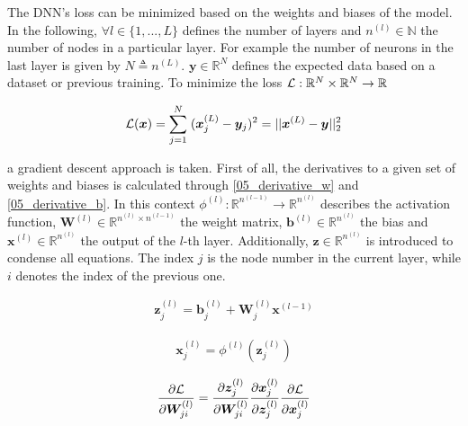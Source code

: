 The DNN's loss can be minimized based on the weights and biases of the model. In the following,
$\forall l \in \{ 1, ..., L \}$ defines the number of layers and $n^{(l)} \in \mathbb{N}$ the number of nodes in a particular layer.
For example the number of neurons in the last layer is given by $N \triangleq n^{(L)}$. $\bm{y} \in \mathbb{R}^N$ defines the expected data based on a dataset or previous training.
To minimize the loss $\mathcal{L} : \mathbb{R}^{N} \times \mathbb{R}^{N} \rightarrow \mathbb{R}$
\endgroup

\begin{equation}
\label{05_loss}
\begin{aligned}
  \mathcal{L}(\bm{x}) = \sum_{j=1}^{N} \; (\bm{x}_j^{(L)} - \bm{y}_j)^2 = \lvert\lvert \bm{x}^{(L)} - \bm{y} \rvert\rvert^2_2
\end{aligned}
\end{equation}


\begingroup
a gradient descent approach is taken.
First of all, the derivatives to a given set of weights and biases is calculated through \ref{05_derivative_w} and \ref{05_derivative_b}.
In this context $\phi^{(l)} : \mathbb{R}^{n^{(l-1)}}\rightarrow \mathbb{R}^{n^{(l)}}$ describes the activation function,
$\bm{W}^{(l)} \in \mathbb{R}^{n^{(l)} \times n^{(l-1)}}$ the weight matrix, $\bm{b}^{(l)} \in \mathbb{R}^{n^{(l)}}$
the bias and $\bm{x}^{(l)} \in \mathbb{R}^{n^{(l)}}$ the output of the $l$-th layer.
Additionally, $\bm{z} \in \mathbb{R}^{n^{(l)}}$ is introduced to condense all equations. The index $j$ is the node number
in the current layer, while $i$ denotes the index of the previous one.
\endgroup


\begin{equation}
\label{05_z}
\begin{aligned}
  \bm{z}_j^{(l)} = \bm{b}_j^{(l)} + \bm{W}_j^{(l)} \bm{x}^{(l-1)}
\end{aligned}
\end{equation}

\begin{equation}
\label{05_x}
\begin{aligned}
  \bm{x}_j^{(l)} = \phi^{(l)}(\bm{z}_j^{(l)})
\end{aligned}
\end{equation}


\begin{equation}
\label{05_derivative_w}
\begin{aligned}
  \frac{\partial \mathcal{L}}{\partial \bm{W}_{j i}^{(l)}} = \frac{\partial \bm{z}_j^{(l)}}{\partial \bm{W}_{j i}^{(l)}} \frac{\partial \bm{x}_j^{(l)}}{\partial \bm{z}_j^{(l)}} \frac{\partial \mathcal{L}}{\partial \bm{x}_j^{(l)}}
\end{aligned}
\end{equation}


